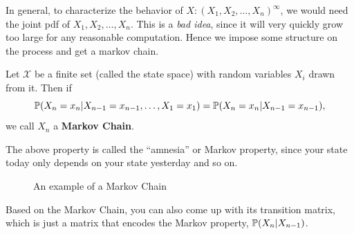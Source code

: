 \documentclass[11 pt]{scrartcl}
\begin{document}
In general, to characterize the behavior of $X: (X_1, X_2, \dots, X_n)^\infty$, we would need the joint pdf of $X_1, X_2, \dots, X_n$. This is a \emph{bad idea}, since it will very quickly grow too large for any reasonable computation. Hence we impose some structure on the process and get a markov chain. 

\begin{definition}
    Let $\mathcal{X}$ be a finite set (called the state space) with random variables $X_i$ drawn from it. Then if 
    \[ \mathbb P(X_n = x_n | X_{n-1} = x_{n-1}, \dots, X_1 = x_1) = \mathbb P(X_n = x_n | X_{n-1} = x_{n-1}),\] 
    we call $X_n$ a \textbf{Markov Chain}.
\end{definition}
The above property is called the ``amnesia'' or Markov property, since your state today only depends on your state yesterday and so on. 

\begin{figure}[!ht]
\begin{center}
\end{center}
\caption{An example of a Markov Chain}
\end{figure}
Based on the Markov Chain, you can also come up with its transition matrix, which is just a matrix that encodes the Markov property, $\mathbb P(X_n | X_{n-1})$. 
\end{document}
